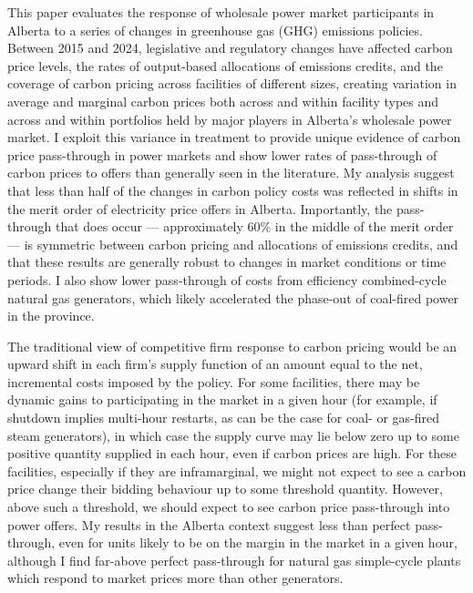 \documentclass[12pt]{article}
\begin{document}
This paper evaluates the response of wholesale power market participants in Alberta to a series of changes in greenhouse gas (GHG) emissions policies. Between 2015 and 2024, legislative and regulatory changes have affected carbon price levels, the rates of output-based allocations of emissions credits, and the coverage of carbon pricing across facilities of different sizes, creating variation in average and marginal carbon prices both across and within facility types and across and within portfolios held by major players in Alberta's wholesale power market. I exploit this variance in treatment to provide unique evidence of carbon price pass-through in power markets and show lower rates of pass-through of carbon prices to offers than generally seen in the literature. My analysis suggest that less than half of the changes in carbon policy costs was reflected in shifts in the merit order of electricity price offers in Alberta. Importantly, the pass-through that does occur --- approximately 60\% in the middle of the merit order --- is symmetric between carbon pricing and allocations of emissions credits, and that these results are generally robust to changes in market conditions or time periods. I also show lower pass-through of costs from efficiency combined-cycle natural gas generators, which likely accelerated the phase-out of coal-fired power in the province. 

The traditional view of competitive firm response to carbon pricing would be an upward shift in each firm's supply function of an amount equal to the net, incremental costs imposed by the policy. For some facilities, there may be dynamic gains to participating in the market in a given hour (for example, if shutdown implies multi-hour restarts, as can be the case for coal- or gas-fired steam generators), in which case the supply curve may lie below zero up to some positive quantity supplied in each hour, even if carbon prices are high. For these facilities, especially if they are inframarginal, we might not expect to see a carbon price change their bidding behaviour up to some threshold quantity. However, above such a threshold, we should expect to see carbon price pass-through into power offers. My results in the Alberta context suggest less than perfect pass-through, even for units likely to be on the margin in the market in a given hour, although I find far-above perfect pass-through for natural gas simple-cycle plants which respond to market prices more than other generators.
\end{document}
